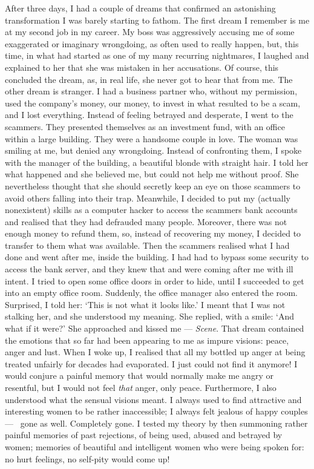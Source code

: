 \documentclass[11pt,twocolumn]{article}
\begin{document}
After three days, I had a couple of dreams that confirmed an
astonishing transformation I was barely starting to fathom. The first
dream I remember is me at my second job in my career. My boss was
aggressively accusing me of some exaggerated or imaginary wrongdoing,
as often used to really happen, but, this time, in what had started as
one of my many recurring nightmares, I laughed and explained to her
that she was mistaken in her accusations. Of course, this concluded
the dream, as, in real life, she never got to hear that from me. The
other dream is stranger. I had a business partner who, without my
permission, used the company's money, our money, to invest in what
resulted to be a scam, and I lost everything. Instead of feeling
betrayed and desperate, I went to the scammers. They presented
themselves as an investment fund, with an office within a large
building. They were a handsome couple in love. The woman was smiling
at me, but denied any wrongdoing. Instead of confronting them, I spoke
with the manager of the building, a beautiful blonde with straight
hair. I told her what happened and she believed me, but could not help
me without proof. She nevertheless thought that she should secretly
keep an eye on those scammers to avoid others falling into their
trap. Meanwhile, I decided to put my (actually nonexistent) skills as
a computer hacker to access the scammers bank accounts and realised
that they had defrauded many people. Moreover, there was not enough
money to refund them, so, instead of recovering my money, I decided to
transfer to them what was available. Then the scammers realised what I
had done and went after me, inside the building. I had had to bypass
some security to access the bank server, and they knew that and were
coming after me with ill intent. I tried to open some office doors in
order to hide, until I succeeded to get into an empty office
room. Suddenly, the office manager also entered the room. Surprised, I
told her: `This is not what it looks like.' I meant that I was not
stalking her, and she understood my meaning. She replied, with a
smile: `And what if it were?' She approached and kissed me ---
\emph{Scene}. That dream contained the emotions that so far had been
appearing to me as impure visions: peace, anger and lust. When I woke
up, I realised that all my bottled up anger at being treated unfairly
for decades had evaporated. I just could not find it anymore! I would
conjure a painful memory that would normally make me angry or
resentful, but I would not feel \emph{that} anger, only
peace. Furthermore, I also understood what the sensual visions
meant. I always used to find attractive and interesting women to be
rather inaccessible; I always felt jealous of happy couples ---~ gone
as well. Completely gone. I tested my theory by then summoning rather
painful memories of past rejections, of being used, abused and
betrayed by women; memories of beautiful and intelligent women who
were being spoken for: no hurt feelings, no self\hyp{}pity would come
up!
\end{document}

